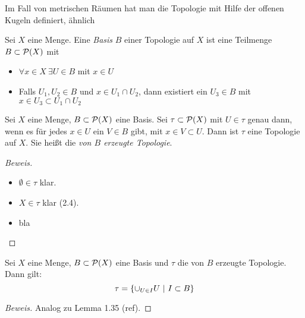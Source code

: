 Im Fall von metrischen Räumen hat man die Topologie mit Hilfe der offenen Kugeln
definiert, ähnlich\begin{dfn}
    Sei $X$ eine Menge. Eine \emph{Basis} $B$ einer Topologie auf $X$ ist eine
    Teilmenge $B\subset\mathcal{P}(X)$ mit
    \begin{itemize}
        \item $\forall x\in X\ \exists U\in B$ mit $x\in U$
        \item Falls $U_1,U_2\in B$ und $x\in U_1 \cap U_2$, dann existiert ein
            $U_3 \in B$ mit $x\in U_3 \subset U_1\cap U_2$
    \end{itemize}
\end{dfn}

\begin{stz}
    Sei $X$ eine Menge, $B\subset\mathcal{P}(X)$ eine Basis. Sei
    $\tau\subset\mathcal{P}(X)$ mit $U\in\tau$ genau dann, wenn es für jedes $x\in U$
    ein $V\in B$ gibt, mit $x\in V\subset U$. Dann ist $\tau$ eine Topologie auf $X$.
    Sie heißt die \emph{von $B$ erzeugte Topologie}.

    \begin{proof}[Beweis]
        \begin{itemize}
            \item $\emptyset\in\tau$ klar.
            \item $X\in\tau$ klar (2.4).
            \item bla
        \end{itemize}
    \end{proof}

\end{stz}

\begin{lem}
    Sei $X$ eine Menge, $B\subset\mathcal{P}(X)$ eine Basis und $\tau$ die von $B$
    erzeugte Topologie. Dann gilt: \[\tau = \mdef[\cup_{U\in I}U]{I\subset B}\]

    \begin{proof}[Beweis]
        Analog zu Lemma 1.35 (ref).
    \end{proof}
\end{lem}

